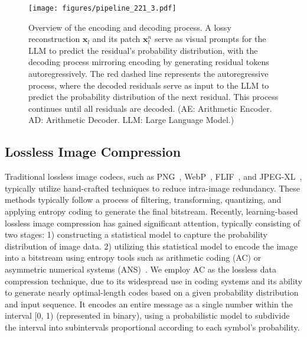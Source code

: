 \begin{figure*}[t]
    \centering
    \texttt{[image: figures/pipeline\_221\_3.pdf]}
        \caption{Overview of the encoding and decoding process. A lossy reconstruction $\mathbf{x}_l$ and its patch $\mathbf{x}_l^n$ serve as visual prompts for the LLM to predict the residual's probability distribution, with the decoding process mirroring encoding by generating residual tokens autoregressively. The red dashed line represents the autoregressive process, where the decoded residuals serve as input to the LLM to predict the probability distribution of the next residual. This process continues until all residuals are decoded. (AE: Arithmetic Encoder. AD: Arithmetic Decoder. LLM: Large Language Model.)}
    \label{fig:pipeline}
\end{figure*}

\subsection{Lossless Image Compression} 

Traditional lossless image codecs, such as PNG~\cite{boutell1997png}, WebP~\cite{webp_tech_report}, FLIF~\cite{sneyers2016flif}, and JPEG-XL~\cite{alakuijala2019jpeg}, typically utilize hand-crafted techniques to reduce intra-image redundancy. These methods typically follow a process of filtering, transforming, quantizing, and applying entropy coding to generate the final bitstream. 
Recently, learning-based lossless image compression has gained significant attention, typically consisting of two stages:
1) constructing a statistical model to capture the probability distribution of image data. 
2) utilizing this statistical model to encode the image into a bitstream using entropy tools such as arithmetic coding (AC) or asymmetric numerical systems (ANS)~\cite{duda2013asymmetric}. We employ AC as the lossless data compression technique, due to its widespread use in coding systems and its ability to generate nearly optimal-length codes based on a given probability distribution and input sequence. It encodes an entire message as a single number within the interval [0, 1) (represented in binary), using a probabilistic model to subdivide the interval into subintervals proportional according to each symbol's probability. 

